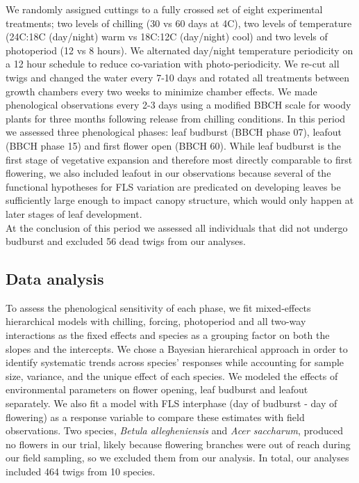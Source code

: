 \documentclass[12pt]{article}\usepackage[]{graphicx}\usepackage[]{color}
\begin{document}
\noindent We randomly assigned cuttings to a fully crossed set of eight experimental treatments; two levels of chilling (30 vs 60 days at 4\degree C), two levels of temperature (24\degree C:18\degree C (day/night) warm vs 18\degree C:12\degree C (day/night) cool) and two levels of photoperiod (12 vs 8 hours). We alternated day/night temperature periodicity on a 12 hour schedule to reduce co-variation with photo-periodicity. We re-cut all twigs and changed the water every 7-10 days and rotated all treatments between growth chambers every two weeks to minimize chamber effects. We made phenological observations every 2-3 days using a modified BBCH scale for woody plants \citep{Finn2007} for three months following release from chilling conditions. In this period we assessed three phenological phases: leaf budburst (BBCH phase 07), leafout (BBCH phase 15) and first flower open (BBCH 60). While leaf budburst is the first stage of vegetative expansion and therefore most directly comparable to first flowering, we also included leafout in our observations because several of the functional hypotheses for FLS variation are predicated on developing leaves be sufficiently large enough to impact canopy structure, which would only happen at later stages of leaf development.\\ 

\noindent At the conclusion of this period we assessed all individuals that did not undergo budburst and excluded 56 dead twigs from our analyses. 

\subsection*{Data analysis}

\noindent To assess the phenological sensitivity of each phase, we fit mixed-effects hierarchical models with chilling, forcing, photoperiod and all two-way interactions as the fixed effects and species as a grouping factor on both the slopes and the intercepts. We chose a Bayesian hierarchical approach in order to identify systematic trends across species' responses while accounting for sample size, variance, and the unique effect of each species. %
We modeled the effects of environmental parameters on flower opening, leaf budburst and leafout separately. We also fit a model with FLS interphase (day of budburst - day of flowering) as a response variable to compare these estimates with field observations. Two species, \textit{Betula allegheniensis} and \textit{Acer saccharum}, produced no flowers in our trial, likely because flowering branches were out of reach during our field sampling, so we excluded them from our analysis. In total, our analyses included 464 twigs from 10 species. \\ 
\end{document}
